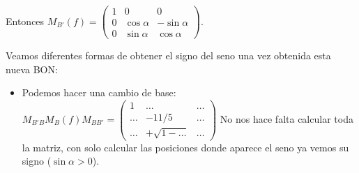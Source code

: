 \documentclass[14pt]{book}
\begin{document}
\begin{ej}
\begin{enumerate}
\begin{enumerate}
			Entonces $M_{B'}(f) = \left(\begin{array}{ccc}
				1 & 0 & 0 \\ 0 & \cos \alpha & -\sin \alpha \\ 0 & \sin \alpha & \cos \alpha
			\end{array}\right)$.
		\end{enumerate}
	\end{enumerate}

	Veamos diferentes formas de obtener el signo del seno una vez obtenida esta nueva BON:
	\begin{itemize}
		\item Podemos hacer una cambio de base: $M_{B' B}M_B(f)M_{B B'} = \left(\begin{array}{ccc}
		1 & \dots & \dots \\ \dots & -11/5 & \dots \\ \dots & +\sqrt{1 - \dots} & \dots
		\end{array}\right)$ No nos hace falta calcular toda la matriz, con solo calcular las posiciones donde aparece el seno ya vemos su signo ($\sin \alpha > 0$).
		

\end{itemize}
\end{ej}
\end{document}
